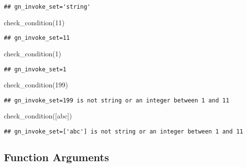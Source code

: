 \documentclass[
]{book}
\newenvironment{Shaded}{\begin{snugshade}}{\end{snugshade}}
\newcommand{\DecValTok}[1]{\textcolor[rgb]{0.00,0.00,0.81}{#1}}
\newcommand{\NormalTok}[1]{#1}
\newcommand{\StringTok}[1]{\textcolor[rgb]{0.31,0.60,0.02}{#1}}
\begin{document}
\begin{verbatim}
## gn_invoke_set='string'
\end{verbatim}

\begin{Shaded}
\begin{Highlighting}[]
\NormalTok{check\_condition(}\DecValTok{11}\NormalTok{)}
\end{Highlighting}
\end{Shaded}

\begin{verbatim}
## gn_invoke_set=11
\end{verbatim}

\begin{Shaded}
\begin{Highlighting}[]
\NormalTok{check\_condition(}\DecValTok{1}\NormalTok{)}
\end{Highlighting}
\end{Shaded}

\begin{verbatim}
## gn_invoke_set=1
\end{verbatim}

\begin{Shaded}
\begin{Highlighting}[]
\NormalTok{check\_condition(}\DecValTok{199}\NormalTok{)}
\end{Highlighting}
\end{Shaded}

\begin{verbatim}
## gn_invoke_set=199 is not string or an integer between 1 and 11
\end{verbatim}

\begin{Shaded}
\begin{Highlighting}[]
\NormalTok{check\_condition([}\StringTok{\textquotesingle{}abc\textquotesingle{}}\NormalTok{])}
\end{Highlighting}
\end{Shaded}

\begin{verbatim}
## gn_invoke_set=['abc'] is not string or an integer between 1 and 11
\end{verbatim}

\hypertarget{function-arguments}{%
\subsection{Function Arguments}\label{function-arguments}}
\end{document}
